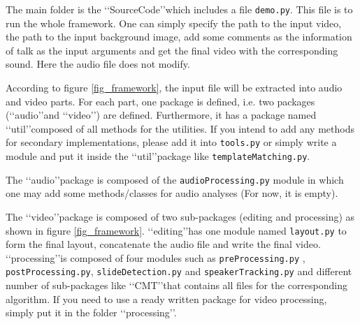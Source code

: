 \documentclass[[12pt,DIV14,BCOR12mm,a4paper,footexclude,headinclude,halfparskip-,twoside,openright,cleardoubleempty,idxtotoc,bibtotoc]{article}
\begin{document}
The main folder is the \lq\lq SourceCode\rq\rq which includes a file \texttt{demo.py}. This file is to run the whole framework. One can simply specify the path to the input video, the path to the input background image, add some comments as the information of talk as the input arguments and get the final video with the corresponding sound. Here the audio file does not modify.

According to figure \ref{fig_framework}, the input file will be extracted into audio and video parts. For each part, one package is defined, i.e. two packages (\lq\lq audio\rq\rq and \lq\lq video\rq\rq) are defined. Furthermore, it has a package named \lq\lq util\rq\rq composed of all methods for the utilities. If you intend to add any methods for secondary implementations, please add it into \texttt{tools.py} or simply write a module and put it inside the \lq\lq util\rq\rq package like \texttt{templateMatching.py}.

The \lq\lq audio\rq\rq package is composed of the \texttt{audioProcessing.py} module in which one may add some methods/classes for audio analyses (For now, it is empty).

The \lq\lq video\rq\rq package is composed of two sub-packages (editing and processing) as shown in figure \ref{fig_framework}.  \lq\lq editing\rq\rq has one module named \texttt{layout.py} to form the final layout, concatenate the audio file and write the final video. \lq\lq processing\rq\rq is composed of four modules such as \texttt{preProcessing.py} , \texttt{postProcessing.py}, \texttt{slideDetection.py} and \texttt{speakerTracking.py} and different number of sub-packages like \lq\lq CMT\rq\rq that contains all files for the corresponding algorithm. If you need to use a ready written package for video processing, simply put it in the folder \lq\lq processing\rq\rq.
\end{document}

